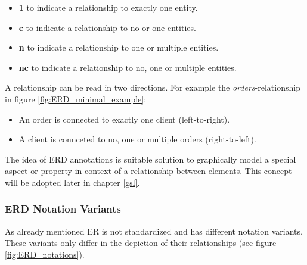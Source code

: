 \documentclass[twoside, openright, 12pt]{book}
\begin{document}
\begin{itemize}
\setlength\itemsep{0em}
\item \textbf{1} to indicate a relationship to exactly one entity.
\item \textbf{c} to indicate a relationship to no or one entities.
\item \textbf{n} to indicate a relationship to one or multiple entities.
\item \textbf{nc} to indicate a relationship to no, one or multiple entities.
\end{itemize}

\noindent
A relationship can be read in two directions.
For example the \textit{orders}-relationship in figure \ref{fig:ERD_minimal_example}:

\begin{itemize}
\setlength\itemsep{0em}
\item An order is connected to exactly one client (left-to-right).
\item A client is connceted to no, one or multiple orders (right-to-left).
\end{itemize}



\noindent
The idea of ERD annotations is suitable solution to graphically model a special aspect or property in context of a relationship between elements.
This concept will be adopted later in chapter \ref{gsl}.



\subsubsection{ERD Notation Variants}
\label{ERD_notations}
As already mentioned ER is not standardized and has different notation variants.
These variants only differ in the depiction of their relationships (see figure \ref{fig:ERD_notations}).
\end{document}
